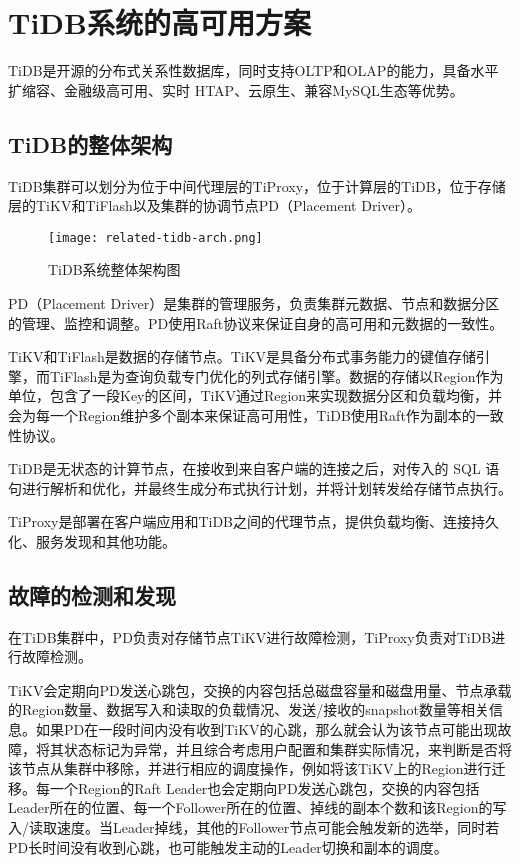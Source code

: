 \section{TiDB系统的高可用方案}
TiDB\cite{huang2020tidb}是开源的分布式关系性数据库，同时支持OLTP和OLAP的能力，具备水平扩缩容、金融级高可用、实时 HTAP、云原生、兼容MySQL生态等优势。

\subsection{TiDB的整体架构}

TiDB集群可以划分为位于中间代理层的TiProxy，位于计算层的TiDB，位于存储层的TiKV和TiFlash以及集群的协调节点PD（Placement Driver）。

\begin{figure}
  \centering
  \texttt{[image: related-tidb-arch.png]}
  \caption{TiDB系统整体架构图}
  \label{fig:tidb-arch}
\end{figure}

PD（Placement Driver）是集群的管理服务，负责集群元数据、节点和数据分区的管理、监控和调整。PD使用Raft协议来保证自身的高可用和元数据的一致性。

TiKV和TiFlash是数据的存储节点。TiKV是具备分布式事务能力的键值存储引擎，而TiFlash是为查询负载专门优化的列式存储引擎。数据的存储以Region作为单位，包含了一段Key的区间，TiKV通过Region来实现数据分区和负载均衡，并会为每一个Region维护多个副本来保证高可用性，TiDB使用Raft作为副本的一致性协议。

TiDB是无状态的计算节点，在接收到来自客户端的连接之后，对传入的 SQL 语句进行解析和优化，并最终生成分布式执行计划，并将计划转发给存储节点执行。

TiProxy是部署在客户端应用和TiDB之间的代理节点，提供负载均衡、连接持久化、服务发现和其他功能。


\subsection{故障的检测和发现}

在TiDB集群中，PD负责对存储节点TiKV进行故障检测，TiProxy负责对TiDB进行故障检测。

TiKV会定期向PD发送心跳包，交换的内容包括总磁盘容量和磁盘用量、节点承载的Region数量、数据写入和读取的负载情况、发送/接收的snapshot数量等相关信息。如果PD在一段时间内没有收到TiKV的心跳，那么就会认为该节点可能出现故障，将其状态标记为异常，并且综合考虑用户配置和集群实际情况，来判断是否将该节点从集群中移除，并进行相应的调度操作，例如将该TiKV上的Region进行迁移。每一个Region的Raft Leader也会定期向PD发送心跳包，交换的内容包括Leader所在的位置、每一个Follower所在的位置、掉线的副本个数和该Region的写入/读取速度。当Leader掉线，其他的Follower节点可能会触发新的选举，同时若PD长时间没有收到心跳，也可能触发主动的Leader切换和副本的调度。


